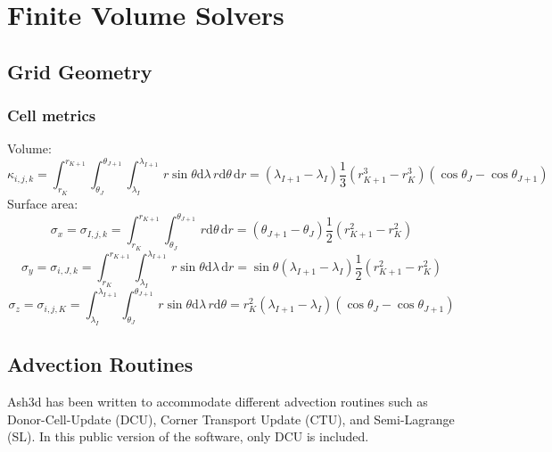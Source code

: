 \chapter{Finite Volume Solvers}\label{ChapAppendFVSolvers}
\section{Grid Geometry}


\subsection{Cell metrics}
Volume:
\begin{equation}\label{EqCellVolLL}
\kappa_{i,j,k} = \int_{r_K}^{r_{K+1}} \int_{\theta_J}^{\theta_{J+1}} \int_{\lambda_I}^{\lambda_{I+1}}
\, r \sin{\theta} \mathrm{d}\lambda \, r \mathrm{d}\theta \, \mathrm{d}r
= \left( \lambda_{I+1} - \lambda_{I} \right) \frac{1}{3} \left( r_{K+1}^3 - r_{K}^3 \right)
\left( \cos{\theta_{J}} - \cos{\theta_{J+1}}\right)
\end{equation}
Surface area:
\begin{equation}\label{EqCellSurfILL}
\sigma_x=\sigma_{I,j,k} = \int_{r_K}^{r_{K+1}} \int_{\theta_J}^{\theta_{J+1}}
\, r \mathrm{d}\theta \, \mathrm{d}r
= \left( \theta_{J+1} - \theta_{J} \right) \frac{1}{2} \left( r_{K+1}^2 - r_{K}^2 \right)
\end{equation}
%
\begin{equation}\label{EqCellSurfJLL}
\sigma_y=\sigma_{i,J,k} = \int_{r_K}^{r_{K+1}} \int_{\lambda_I}^{\lambda_{I+1}}
\, r \sin{\theta} \mathrm{d}\lambda \, \mathrm{d}r
= \sin{\theta}\left( \lambda_{I+1} - \lambda_{I} \right) \frac{1}{2} \left( r_{K+1}^2 - r_{K}^2 \right)
\end{equation}
%
\begin{equation}\label{EqCellSurfKLL}
\sigma_z=\sigma_{i,j,K} = \int_{\lambda_I}^{\lambda_{I+1}} \int_{\theta_J}^{\theta_{J+1}}
\, r \sin{\theta} \mathrm{d}\lambda \, r\mathrm{d}\theta
= r_{K}^2 \left( \lambda_{I+1} - \lambda_{I} \right) \left( \cos{\theta_{J}} - \cos{\theta_{J+1}}  \right)
\end{equation}

\section{Advection Routines}
Ash3d has been written to accommodate different advection routines such as
Donor-Cell-Update (DCU), Corner Transport Update (CTU), and Semi-Lagrange (SL).
In this public version of the software, only DCU is included.

